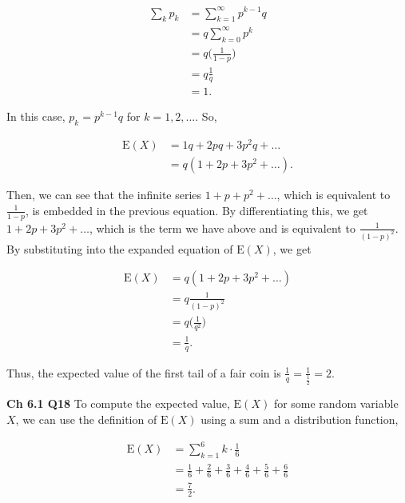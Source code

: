\documentclass[12pt]{article}
\newcommand{\nspace}{\vspace*{.5cm}}
\newcommand{\nline}{\nspace \noindent}
\begin{document}
\begin{align*}
\sum_{k} p_k &= \sum_{k=1}^{\infty} p^{k-1} q \\
&= q \sum_{k=0}^{\infty} p^{k} \\
&= q \Big ( \frac{1}{1-p} \Big ) \\
&= q \frac{1}{q} \\
&= 1.
\end{align*}

\nline
In this case, $p_k = p^{k-1} q$ for $k = 1,2,\ldots$. So,

\begin{align*}
\text{E}(X) &= 1q + 2pq + 3p^2q + \ldots \\
&= q (1 + 2p + 3p^2 + \ldots).
\end{align*}

\nline
Then, we can see that the infinite series $1 + p + p^2 + \ldots$, which is equivalent to $\frac{1}{1-p}$, is embedded in the previous equation. By differentiating this, we get $1 + 2p + 3p^2 + \ldots$, which is the term we have above and is equivalent to $\frac{1}{(1-p)^2}$. By substituting into the expanded equation of $\text{E}(X)$, we get 

\begin{align*}
\text{E}(X) &= q (1 + 2p + 3p^2 + \ldots) \\
&= q \frac{1}{(1-p)^2} \\
&= q \Big ( \frac{1}{q^2} \Big ) \\
&= \frac{1}{q}.
\end{align*}

\nline
Thus, the expected value of the first tail of a fair coin is $\frac{1}{q} = \frac{1}{\frac{1}{2}} = 2$. 


\nline
\textbf{Ch 6.1 Q18} To compute the expected value, $\text{E}(X)$ for some random variable $X$, we can use the definition of $\text{E}(X)$ using a sum and a distribution function,

\begin{align*}
\text{E}(X) &= \sum_{k=1}^{6} k \cdot \frac{1}{6} \\
&= \frac{1}{6} + \frac{2}{6} + \frac{3}{6} + \frac{4}{6} + \frac{5}{6} + \frac{6}{6} \\
&= \frac{7}{2}.
\end{align*}

\end{document}
